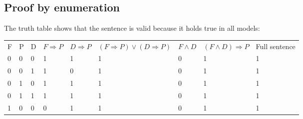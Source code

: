 \documentclass{article}
\begin{document}
\subsection*{Proof by enumeration}
The truth table shows that the sentence is valid because it holds true in all models:

\begin{table}[h]
\begin{tabular}{lllllllll}
F & P & D & $F \Longrightarrow P$ & $D \Longrightarrow P$ & $(F \Longrightarrow P) \vee (D \Longrightarrow P)$ & $ F \wedge D$ & $(F \wedge D) \Longrightarrow P$ & Full sentence \\
0 & 0 & 0 & 1                     & 1                     & 1                                                  &  0            & 1                                & 1                                                                                                                                                                                                     \\
0 & 0 & 1 & 1                     & 0                     & 1                                                  &  0            & 1                                & 1                                                                                                                                                                                                     \\
0 & 1 & 0 & 1                     & 1                     & 1                                                  &  0            & 1                                & 1                                                                                                                                                                                                     \\
0 & 1 & 1 & 1                     & 1                     & 1                                                  &  0            & 1                                & 1                                                                                                                                                                                                     \\
1 & 0 & 0 & 0                     & 1                     & 1                                                  &  0            & 1                                & 1                                                                                                                                                                                                     \\

\end{tabular}
\end{table}
\end{document}
